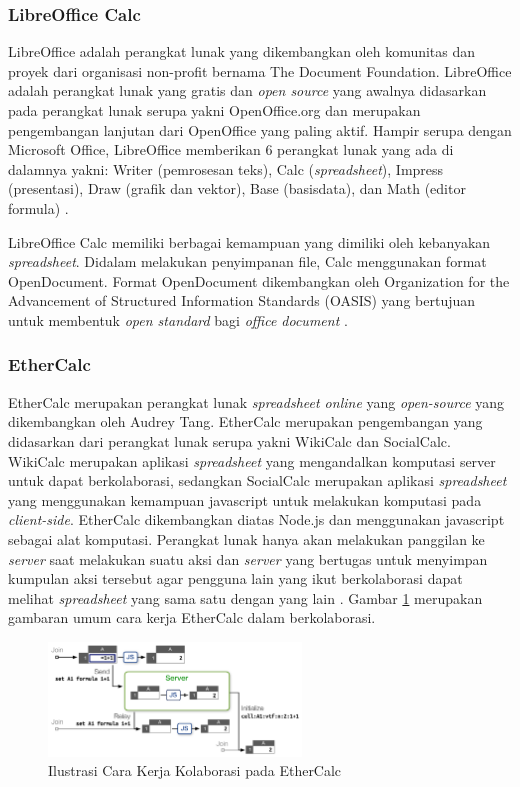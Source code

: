     \subsubsection{LibreOffice Calc}
    LibreOffice adalah perangkat lunak yang dikembangkan oleh komunitas dan proyek dari organisasi non-profit bernama The Document Foundation. LibreOffice adalah perangkat lunak yang gratis dan \textit{open source} yang awalnya didasarkan pada perangkat lunak serupa yakni OpenOffice.org dan merupakan pengembangan lanjutan dari OpenOffice yang paling aktif. Hampir serupa dengan Microsoft Office, LibreOffice memberikan 6 perangkat lunak yang ada di dalamnya yakni: Writer (pemrosesan teks), Calc (\textit{spreadsheet}), Impress (presentasi), Draw (grafik dan vektor), Base (basisdata), dan Math (editor formula) \citep{LibreOffice}. 

    LibreOffice Calc memiliki berbagai kemampuan yang dimiliki oleh kebanyakan \textit{spreadsheet}. Didalam melakukan penyimpanan file, Calc menggunakan format OpenDocument. Format OpenDocument dikembangkan oleh Organization for the Advancement of Structured Information Standards (OASIS) yang bertujuan untuk membentuk \textit{open standard} bagi \textit{office document} \citep{OpenDocument}. 

    \subsubsection{EtherCalc} \label{AboutEtherCalc}
    EtherCalc merupakan perangkat lunak \textit{spreadsheet online} yang \textit{open-source} yang dikembangkan oleh Audrey Tang. EtherCalc merupakan pengembangan yang didasarkan dari perangkat lunak serupa yakni WikiCalc dan SocialCalc. WikiCalc merupakan aplikasi \textit{spreadsheet} yang mengandalkan komputasi server untuk dapat berkolaborasi, sedangkan SocialCalc merupakan aplikasi \textit{spreadsheet} yang menggunakan kemampuan javascript untuk melakukan komputasi pada \textit{client-side}. EtherCalc dikembangkan diatas Node.js dan menggunakan javascript sebagai alat komputasi. Perangkat lunak hanya akan melakukan panggilan ke \textit{server} saat melakukan suatu aksi dan \textit{server} yang bertugas untuk menyimpan kumpulan aksi tersebut agar pengguna lain yang ikut berkolaborasi dapat melihat \textit{spreadsheet} yang sama satu dengan yang lain \citep{EtherCalc}. Gambar \ref{IlustrasiEtherCalc} merupakan gambaran umum cara kerja EtherCalc dalam berkolaborasi.

    \begin{figure}[htb]
        \centering
        \includegraphics[width=0.6\textwidth]{resources/chapter-2-ethercalc.png}
        \caption{Ilustrasi Cara Kerja Kolaborasi pada EtherCalc}
        \label{IlustrasiEtherCalc}
    \end{figure}

